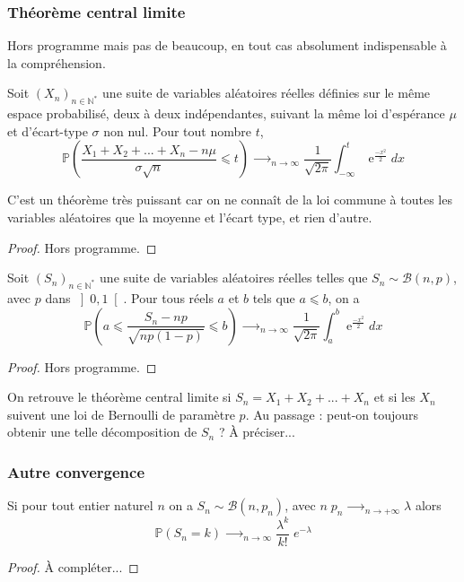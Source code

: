 \subsubsection{Théorème central limite}
Hors programme mais pas de beaucoup, en tout cas absolument indispensable à la compréhension.
\begin{theorem}
Soit \((𝑋_{𝑛})_{𝑛∈ℕ^{ *}}\) une suite de variables aléatoires réelles définies sur le même espace probabilisé,
deux à deux indépendantes, suivant la même loi d'espérance \(𝜇\) et d'écart-type \(𝜎\) non nul. Pour tout nombre
\(𝑡\),
\begin{equation*}
ℙ\left(\frac{𝑋_1+𝑋_2+...+𝑋_𝑛-𝑛𝜇}{𝜎\sqrt{𝑛}}⩽t\right)\mathop{⟶}_{𝑛→∞}\frac 1{\sqrt{2π}}\int
_{-∞}^t\operatorname{e}^{\frac{-x^2} 2}\mathit{dx}
\end{equation*}
\end{theorem}
\begin{remark}
C'est un théorème très puissant car on ne connaît de la loi commune à toutes les variables aléatoires que la moyenne et
l'écart type, et rien d'autre.
\end{remark}
\begin{proof}
Hors programme.
\end{proof}
\begin{theorem}
Soit \((𝑆_{𝑛})_{𝑛∈ℕ^{ *}}\) une suite de variables aléatoires réelles telles que \(𝑆_{𝑛}∼ℬ(𝑛,𝑝)\),
avec \(𝑝\) dans \(\left]0,1\right[\).
Pour tous réels \(𝑎\) et \(𝑏\) tels que \(𝑎⩽𝑏\), on a
\begin{equation*}
ℙ\left(𝑎⩽\frac{𝑆_𝑛-𝑛𝑝}{\sqrt{𝑛𝑝(1-𝑝)}}⩽𝑏\right)\mathop{⟶}_{𝑛→∞}\frac 1{\sqrt{2π}}\int
_{𝑎}^{𝑏}\operatorname{e}^{\frac{-x^2} 2}\mathit{dx}
\end{equation*}
\end{theorem}
\begin{proof}
Hors programme.
\end{proof}
\begin{remark}
On retrouve le théorème central limite si
\(𝑆_{𝑛}=𝑋_1+𝑋_2+...+𝑋_{𝑛}\) et si les \(𝑋_{𝑛}\) suivent une loi de Bernoulli de paramètre \(𝑝\). Au passage :
peut-on toujours obtenir une telle décomposition de \(𝑆_{𝑛}\) ? À préciser...
\end{remark}
\subsubsection[Autre convergence]{Autre convergence}
\begin{theorem}
Si pour tout entier naturel \(𝑛\) on a \(𝑆_{𝑛}∼ℬ(𝑛,𝑝_{𝑛})\), avec
\(𝑛\;𝑝_{𝑛}\mathop{⟶}_{n→+∞}𝜆\) alors
\begin{equation*}
ℙ\left(𝑆_{𝑛}=𝑘\right)\mathop{⟶}_{𝑛→∞}\frac{𝜆^{𝑘}}{𝑘!}\;e^{-𝜆}
\end{equation*}
\end{theorem}
\begin{proof}
À compléter...
\end{proof}
